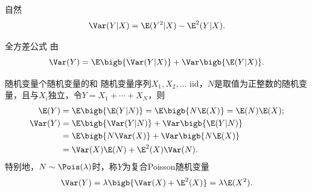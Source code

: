 自然
\begin{equation}
	\Var(Y|X)=\E(Y^2|X)-\E^2(Y|X).
\end{equation}
\begin{theorem}{全方差公式}{}
	由
	\begin{equation}
		\Var(Y)=\E\bigb{\Var(Y|X)}+\Var\bigb{\E(Y|X)}.
	\end{equation}
\end{theorem}
\begin{example}{随机变量个随机变量的和}{}
	随机变量序列$X_1,X_2,\ldots$ iid，$N$是取值为正整数的随机变量，且与$X_i$独立，令$Y=X_1+\cdots+X_N$，则
	\begin{subequations}
		\begin{align}
			\E(Y)&=\E\bigb{\E(Y|N)}=\E\bigb{N\E(X)}=\E(N)\E(X);\\
			\notag
			\Var(Y)&=\E\bigb{\Var(Y|N)}+\Var\bigb{\E(Y|N)}\\
			\notag
			&=\E\bigb{N\Var(X)}+\Var\bigb{N\E(X)}\\
			&=\Var(X)\E(N)+\E^2(X)\Var(N).
		\end{align}
	\end{subequations}
	特别地，$N\sim\Pois(\lambda)$时，称$Y$为复合Poisson随机变量
	\[
		\Var(Y)=\lambda\bigb{\Var(X)+\E^2(X)}=\lambda\E(X^2).
	\]
\end{example}